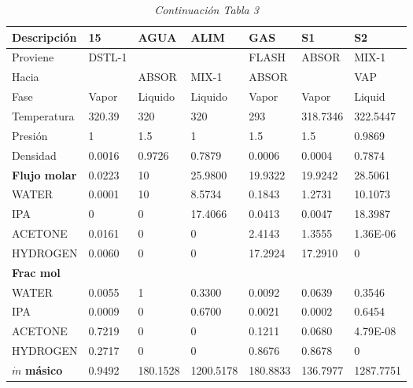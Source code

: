 \begin{table}[H]
    \centering
    \caption{\textit{Continuación Tabla 3}}\begin{tabular}{lllllll}
    \label{cont_tab_3}
    \hline
    Descripción    & 15     & AGUA     & ALIM      & GAS       & S1        & S2         \\ \hline
    Proviene            & DSTL-1 &          &           & FLASH     & ABSOR     & MIX-1      \\
     Hacia             &        & ABSOR    & MIX-1     & ABSOR     &           & VAP        \\
    Fase          & Vapor  & Liquido   & Liquido   & Vapor     & Vapor     & Liquid     \\
    Temperatura   & 320.39 & 320      & 320       & 293       & 318.7346  & 322.5447   \\
    Presión        & 1      & 1.5      & 1         & 1.5       & 1.5       & 0.9869     \\
    Densidad   & 0.0016 & 0.9726   & 0.7879    & 0.0006    & 0.0004    & 0.7874     \\
    \textbf{Flujo molar}     & 0.0223 & 10       & 25.9800   & 19.9322   & 19.9242   & 28.5061    \\
    WATER          & 0.0001 & 10       & 8.5734    & 0.1843    & 1.2731    & 10.1073    \\
    IPA            & 0      & 0        & 17.4066   & 0.0413    & 0.0047    & 18.3987    \\
    ACETONE        & 0.0161 & 0        & 0         & 2.4143    & 1.3555    & 1.36E-06   \\
    HYDROGEN       & 0.0060 & 0        & 0         & 17.2924   & 17.2910   & 0          \\
    \textbf{Frac mol} &        &          &           &           &           &            \\
    WATER          & 0.0055 & 1        & 0.3300    & 0.0092    & 0.0639    & 0.3546     \\
    IPA            & 0.0009 & 0        & 0.6700    & 0.0021    & 0.0002    & 0.6454     \\
    ACETONE        & 0.7219 & 0        & 0         & 0.1211    & 0.0680    & 4.79E-08   \\
    HYDROGEN       & 0.2717 & 0        & 0         & 0.8676    & 0.8678    & 0          \\
    $\dot{m}$ \textbf{ másico}     & 0.9492 & 180.1528 & 1200.5178 & 180.8833  & 136.7977  & 1287.7751  \\

\end{tabular}
\end{table}
